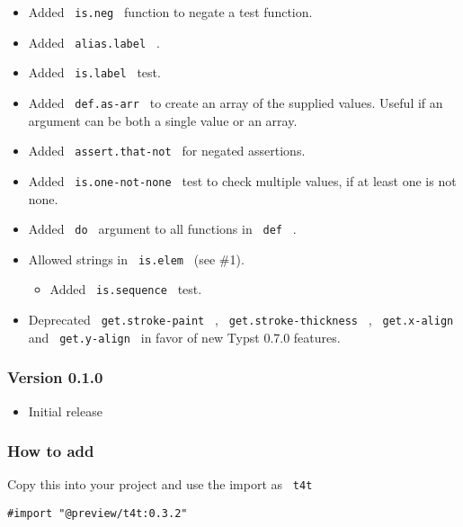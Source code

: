 \begin{itemize}
\tightlist
\item
  Added \texttt{\ is.neg\ } function to negate a test function.
\item
  Added \texttt{\ alias.label\ } .
\item
  Added \texttt{\ is.label\ } test.
\item
  Added \texttt{\ def.as-arr\ } to create an array of the supplied
  values. Useful if an argument can be both a single value or an array.
\item
  Added \texttt{\ assert.that-not\ } for negated assertions.
\item
  Added \texttt{\ is.one-not-none\ } test to check multiple values, if
  at least one is not none.
\item
  Added \texttt{\ do\ } argument to all functions in \texttt{\ def\ } .
\item
  Allowed strings in \texttt{\ is.elem\ } (see \#1).

  \begin{itemize}
  \tightlist
  \item
    Added \texttt{\ is.sequence\ } test.
  \end{itemize}
\item
  Deprecated \texttt{\ get.stroke-paint\ } ,
  \texttt{\ get.stroke-thickness\ } , \texttt{\ get.x-align\ } and
  \texttt{\ get.y-align\ } in favor of new Typst 0.7.0 features.
\end{itemize}

\subsubsection{Version 0.1.0}\label{version-0.1.0}

\begin{itemize}
\tightlist
\item
  Initial release
\end{itemize}

\subsubsection{How to add}\label{how-to-add}

Copy this into your project and use the import as \texttt{\ t4t\ }

\begin{verbatim}
#import "@preview/t4t:0.3.2"
\end{verbatim}



